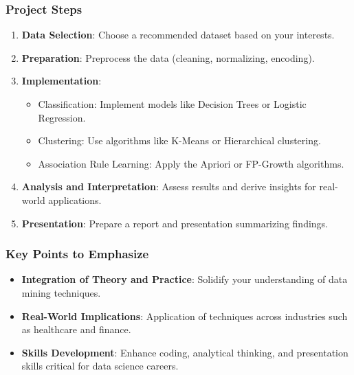 \documentclass[aspectratio=169]{beamer}
\begin{document}
\begin{frame}[fragile]
    \frametitle{Project Steps}
    \begin{enumerate}
        \item \textbf{Data Selection}: Choose a recommended dataset based on your interests.
        \item \textbf{Preparation}: Preprocess the data (cleaning, normalizing, encoding).
        \item \textbf{Implementation}:
        \begin{itemize}
            \item Classification: Implement models like Decision Trees or Logistic Regression.
            \item Clustering: Use algorithms like K-Means or Hierarchical clustering.
            \item Association Rule Learning: Apply the Apriori or FP-Growth algorithms.
        \end{itemize}
        \item \textbf{Analysis and Interpretation}: Assess results and derive insights for real-world applications.
        \item \textbf{Presentation}: Prepare a report and presentation summarizing findings.
    \end{enumerate}
\end{frame}

\begin{frame}[fragile]
    \frametitle{Key Points to Emphasize}
    \begin{itemize}
        \item \textbf{Integration of Theory and Practice}: Solidify your understanding of data mining techniques.
        \item \textbf{Real-World Implications}: Application of techniques across industries such as healthcare and finance.
        \item \textbf{Skills Development}: Enhance coding, analytical thinking, and presentation skills critical for data science careers.
    \end{itemize}
\end{frame}
\end{document}
